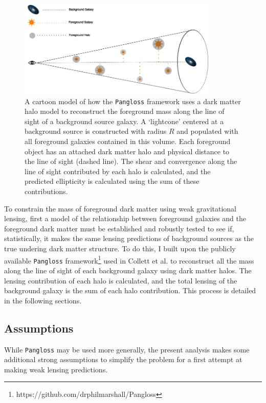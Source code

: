 \documentclass[%
 reprint,
 amsmath,amssymb,
 aps,nofootinbib
]{revtex4-1}
\begin{document}
\begin{figure}
    \centering
    \includegraphics[width=0.85\textwidth]{figs-swe/pangloss_cartoon.png}
    \captionsetup{justification=raggedright,singlelinecheck=false}
    \caption{A cartoon model of how the \texttt{Pangloss} framework uses a dark matter halo model to reconstruct the foreground mass along the line of sight of a background source galaxy. A `lightcone' centered at a background source is constructed with radius $R$ and populated with all foreground galaxies contained in this volume. Each foreground object has an attached dark matter halo and physical distance to the line of sight (dashed line). The shear and convergence along the line of sight contributed by each halo is calculated, and the predicted ellipticity is calculated using the sum of these contributions.}
    \label{pangloss_cartoon}
\end{figure}

To constrain the mass of foreground dark matter using weak gravitational lensing, first a model of the relationship between foreground galaxies and the foreground dark matter must be established and robustly tested to see if, statistically, it makes the same lensing predictions of background sources as the true undering dark matter structure. To do this, I built upon the publicly available \texttt{Pangloss} framework\footnote{https://github.com/drphilmarshall/Pangloss} used in Collett et al. \cite{collett_marshall} to reconstruct all the mass along the line of sight of each background galaxy using dark matter halos. The lensing contribution of each halo is calculated, and the total lensing of the background galaxy is the sum of each halo contribution. This process is detailed in the following sections.

\subsection*{Assumptions}
While \texttt{Pangloss} may be used more generally, the present analysis makes some additional strong assumptions to simplify the problem for a first attempt at making weak lensing predictions.
\end{document}
